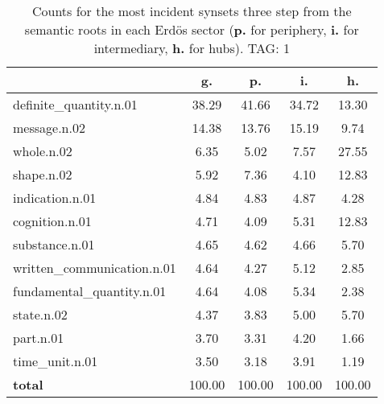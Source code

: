 \begin{table}[h!]
\begin{center}
\begin{tabular}{| l || c | c | c | c |}\hline
 & {\bf g.} & {\bf p.} & {\bf i.} & {\bf h.} \\\hline\hline
definite\_quantity.n.01 & 38.29  & 41.66  & 34.72  & 13.30 \\\hline
message.n.02 & 14.38  & 13.76  & 15.19  & 9.74 \\\hline
whole.n.02 & 6.35  & 5.02  & 7.57  & 27.55 \\\hline
shape.n.02 & 5.92  & 7.36  & 4.10  & 12.83 \\\hline
indication.n.01 & 4.84  & 4.83  & 4.87  & 4.28 \\\hline
cognition.n.01 & 4.71  & 4.09  & 5.31  & 12.83 \\\hline
substance.n.01 & 4.65  & 4.62  & 4.66  & 5.70 \\\hline
written\_communication.n.01 & 4.64  & 4.27  & 5.12  & 2.85 \\\hline
fundamental\_quantity.n.01 & 4.64  & 4.08  & 5.34  & 2.38 \\\hline
state.n.02 & 4.37  & 3.83  & 5.00  & 5.70 \\\hline
part.n.01 & 3.70  & 3.31  & 4.20  & 1.66 \\\hline
time\_unit.n.01 & 3.50  & 3.18  & 3.91  & 1.19 \\\hline\hline
{{\bf total}} & 100.00  & 100.00  & 100.00  & 100.00 \\\hline
\end{tabular}
\caption{Counts for the most incident synsets three step from the semantic roots in each Erd\"os sector ({\bf p.} for periphery, {\bf i.} for intermediary, {\bf h.} for hubs). TAG: 1}
\end{center}
\end{table}